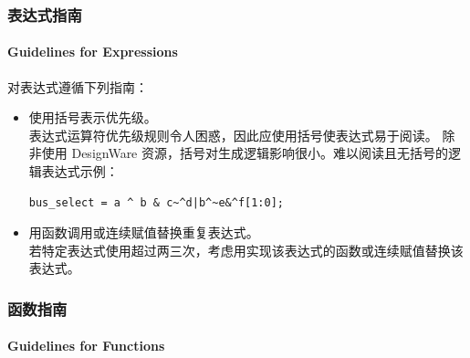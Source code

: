 \subsubsection{表达式指南}
\paragraph*{Guidelines for Expressions}

对表达式遵循下列指南：
\begin{itemize}
  \item 使用括号表示优先级。\\
        表达式运算符优先级规则令人困惑，因此应使用括号使表达式易于阅读。
        除非使用 DesignWare 资源，括号对生成逻辑影响很小。难以阅读且无括号的逻辑表达式示例：
\begin{lstlisting}
bus_select = a ^ b & c~^d|b^~e&^f[1:0];
\end{lstlisting}
  \item 用函数调用或连续赋值替换重复表达式。\\
        若特定表达式使用超过两三次，考虑用实现该表达式的函数或连续赋值替换该表达式。
\end{itemize}

\subsubsection{函数指南}
\paragraph*{Guidelines for Functions}

